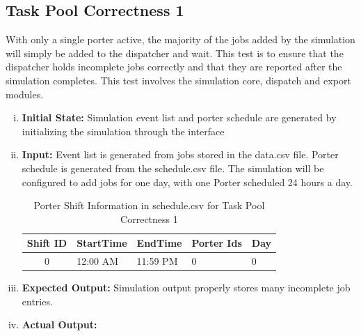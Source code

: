 \documentclass[paper=letter, fontsize=10pt]{scrartcl}
\numberwithin{equation}{section}		%
\numberwithin{figure}{section}			%
\numberwithin{table}{section}				%
\begin{document}
\subsection{Task Pool Correctness 1}
With only a single porter active, the majority of the jobs added by the simulation will simply be added to the dispatcher and wait. This test is to ensure that the dispatcher holds incomplete jobs correctly and that they are reported after the simulation completes. This test involves the simulation core, dispatch and export modules.
\begin{enumerate}[(i)]
	\item \textbf{Initial State:} Simulation event list and porter schedule are generated by initializing the simulation through the interface
	\item \textbf{Input:} Event list is generated from jobs stored in the data.csv file. Porter schedule is generated from the schedule.csv file. The simulation will be configured to add jobs for one day, with one Porter scheduled 24 hours a day.
	\begin{table}
	\caption{Porter Shift Information in schedule.csv for Task Pool Correctness 1}
	\begin{center}
    	\begin{tabular}{| c | l | l | l | l |}
    		\hline
        	Shift ID & StartTime & EndTime & Porter Ids & Day \\ \hline
  			0 & 12:00 AM & 11:59 PM & 0 & 0 \\ \hline
    	\end{tabular}
	\end{center}
	\end{table}
	\item \textbf{Expected Output:} Simulation output properly stores many incomplete job entries.
	\item \textbf{Actual Output:} %
\end{enumerate}
\end{document}
